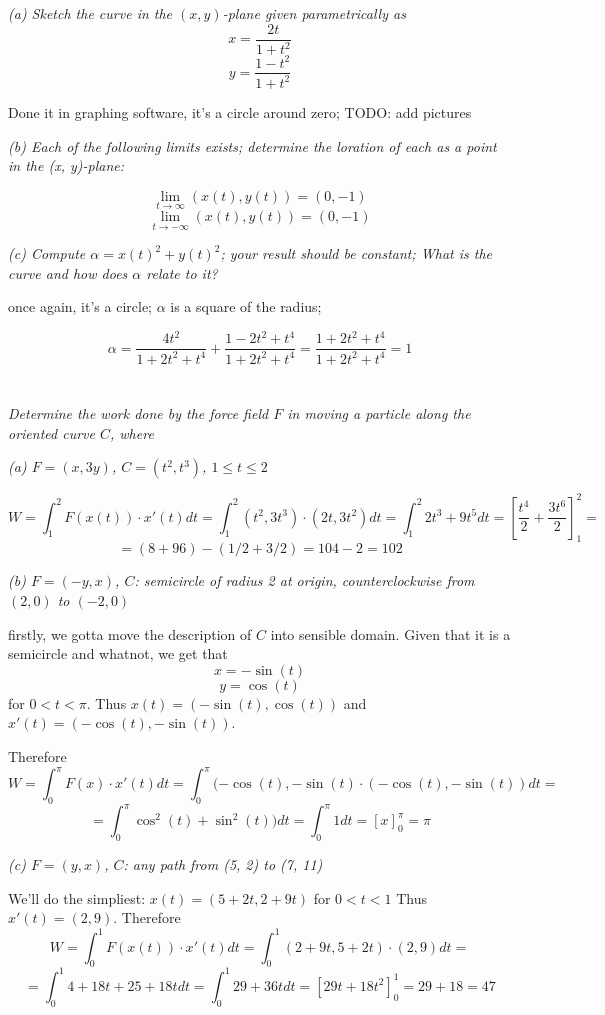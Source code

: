\documentclass[11pt,oneside,titlepage]{book}
\begin{document}
\textit{(a) Sketch the curve in the $(x, y)$-plane given parametrically as }
$$x = \frac{2t}{1 + t^2}$$
$$y = \frac{1 - t^2}{1 + t^2}$$

Done it in graphing software, it's a circle around zero; TODO: add pictures

\textit{(b) Each of the following limits exists; determine the loration of each as a
  point in the (x, y)-plane: }

$$\lim_{t \to \infty}{(x(t), y(t))} = (0, -1)$$
$$\lim_{t \to -\infty}{(x(t), y(t))} = (0, -1)$$

\textit{(c) Compute $\alpha = x(t)^2 + y(t)^2$; your result should be constant; What is the curve
  and how does $\alpha$ relate to it?}

once again, it's a circle; $\alpha$ is a square of the radius;

$$\alpha = \frac{4t^2}{1 + 2t^2 + t^4} + \frac{1 - 2t^2 + t^4}{1 + 2t^2 + t^4} =
\frac{1 + 2t^2 + t^4}{1 + 2t^2 + t^4} = 1$$

\section{}

\textit{Determine the work done by the force field $F$ in moving a particle along the
  oriented curve $C$, where }

\textit{(a) $F = (x, 3y)$, $C = (t^2, t^3)$, $1 \leq t \leq 2$}

$$W = \int_1^2{F(x(t)) \cdot x'(t)dt} = \int_1^2{(t^2, 3t^3) \cdot (2t, 3t^2)dt} =
\int_1^2{2t^3 + 9t^5dt} = \left[\frac{t^4}{2} + \frac{3t^6}{2}\right]_1^2 =$$
$$=
(8 + 96) - (1/2 + 3/2) = 104 - 2 = 102$$

\textit{(b) $F = (-y, x)$, $C$: semicircle of radius 2 at origin, counterclockwise from
  $(2, 0)$ to $(-2, 0)$}

firstly, we gotta move the description of $C$ into sensible domain.
Given that it is a semicircle and whatnot, we get that
$$x = -\sin(t)$$
$$y = \cos(t)$$
for $0 < t < \pi$. Thus $x(t) = (-\sin(t), \cos(t))$ and $x'(t) = (-\cos(t), -\sin(t))$.

Therefore
$$W = \int_0^\pi{F(x) \cdot x'(t) dt} =
\int_0^\pi{(-\cos(t), -\sin(t) \cdot (-\cos(t), -\sin(t)) dt} =$$
$$ = 
\int_0^\pi{\cos^2(t) + \sin^2(t)) dt} =  \int_0^\pi{ 1 dt} =  [x]_0^\pi = \pi$$

\textit{(c) $F=(y, x)$, $C$: any path from (5, 2) to (7, 11)}

We'll do the simpliest: $x(t) = (5 + 2t, 2 + 9t)$ for $0 < t < 1$
Thus $x'(t) = (2, 9)$. Therefore
$$W = \int_0^1{F(x(t)) \cdot x'(t) dt} =  \int_0^1{(2 + 9t, 5 + 2t) \cdot (2, 9) dt} = $$
$$=
\int_0^1{4 + 18t + 25 + 18t dt} = \int_0^1{29 + 36t dt} = [29t + 18t^2]_0^1 = 29 + 18 = 47$$
\end{document}
